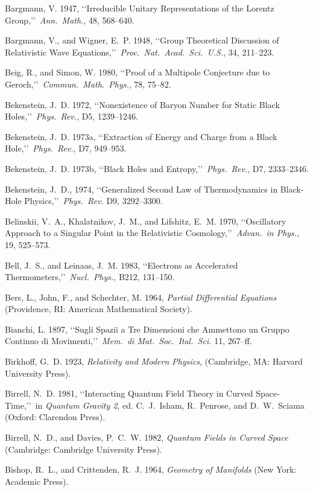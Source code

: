 \item Bargmann, V. 1947, \lq\lq Irreducible Unitary Representations of the Lorentz Group,\rq\rq\ \emph{Ann.\ Math.}, 48, 568--640.
\item Bargmann, V., and Wigner, E.~P. 1948, \lq\lq Group Theoretical Discussion of Relativistic Wave Equations,\rq\rq\ \emph{Proc.\ Nat.\ Acad.\ Sci.\ U.S.}, 34, 211--223.
\item Beig, R., and Simon, W. 1980, \lq\lq Proof of a Multipole Conjecture due to Geroch,\rq\rq\ \emph{Commun.\ Math.\ Phys.}, 78, 75--82.
\item Bekenstein, J.~D. 1972, \lq\lq Nonexistence of Baryon Number for Static Black Holes,\rq\rq\ \emph{Phys.\ Rev.}, D5, 1239--1246.
\item Bekenstein, J.~D. 1973a, \lq\lq Extraction of Energy and Charge from a Black Hole,\rq\rq\ \emph{Phys.\ Rev.}, D7, 949--953.
\item Bekenstein, J.~D. 1973b, \lq\lq Black Holes and Entropy,\rq\rq\ \emph{Phys.\ Rev.}, D7, 2333--2346.
\item Bekenstein, J.~D., 1974, \lq\lq Generalized Second Law of Thermodynamics in Black-Hole Physics,\rq\rq\ \emph{Phys.\ Rev.} D9, 3292--3300.
\item Belinskii, V.~A., Khalatnikov, J.~M., and Lifshitz, E.~M. 1970, \lq\lq Oscillatory Approach to a Singular Point in the Relativistic Cosmology,\rq\rq\ \emph{Advan.\ in Phys.}, 19, 525--573.
\item Bell, J.~S., and Leinaas, J.~M. 1983, \lq\lq Electrons as Accelerated Thermometers,\rq\rq\ \emph{Nucl.\ Phys.}, B212, 131--150.
\item Bers, L., John, F., and Schechter, M. 1964, \emph{Partial Differential Equations} (Providence, RI: American Mathematical Society).
\item Bianchi, L. 1897, \lq\lq Sugli Spazii a Tre Dimensioni che Ammettono un Gruppo Continuo di Movimenti,\rq\rq\ \emph{Mem.\ di Mat.\ Soc.\ Ital.\ Sci.} 11, 267--ff.
\item Birkhoff, G.~D. 1923, \emph{Relativity and Modern Physics}, (Cambridge, MA: Harvard University Press).
\item Birrell, N.~D. 1981, \lq\lq Interacting Quantum Field Theory in Curved Space-Time,\rq\rq\ in \emph{Quantum Gravity 2}, ed. C.~J.~Isham, R.~Penrose, and D.~W.~Sciama (Oxford: Clarendon Press).
\item Birrell, N.~D., and Davies, P.~C.~W. 1982, \emph{Quantum Fields in Curved Space} (Cambridge: Cambridge University Press).
\item Bishop, R.~L., and Crittenden, R.~J. 1964, \emph{Geometry of Manifolds} (New York: Academic Press).
